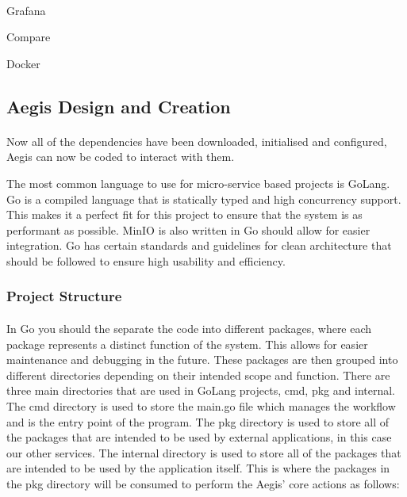 \documentclass[12pt, conference, final, a4paper, onecolumn, compsoc]{IEEEtran}
\begin{document}
\paragraph{}


Grafana


Compare

Docker



\subsection*{Aegis Design and Creation}
\paragraph{}

Now all of the dependencies have been downloaded, initialised and configured,
Aegis can now be coded to interact with them.


The most common language to use for micro-service based projects is GoLang. Go
is a compiled language that is statically typed and high concurrency support.
This makes it a perfect fit for this project to ensure that the system is as
performant as possible. MinIO is also written in Go should allow for easier
integration. Go has certain standards and guidelines for clean architecture that
should be followed to ensure high usability and efficiency.

\subsubsection*{Project Structure}
\paragraph{}

In Go you should the separate the code into different packages, where each
package represents a distinct function of the system. This allows for easier
maintenance and debugging in the future. These packages are then grouped into
different directories depending on their intended scope and function. There are
three main directories that are used in GoLang projects, cmd, pkg and internal.
The cmd directory is used to store the main.go file which manages the workflow
and is the entry point of the program. The pkg directory is used to store all of
the packages that are intended to be used by external applications, in this case
our other services. The internal directory is used to store all of the packages
that are intended to be used by the application itself. This is where the
packages in the pkg directory will be consumed to perform the Aegis' core
actions as follows:
\end{document}
